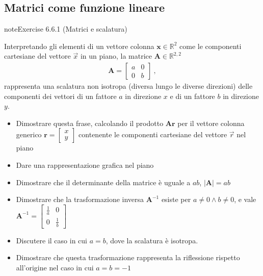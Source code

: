 \documentclass[letterpaper,10pt,italian]{jupyterBook}
\begin{document}
\subsection{Matrici come funzione lineare}
\label{\detokenize{ch/algebra/linear-algebra:matrici-come-funzione-lineare}}\label{\detokenize{ch/algebra/linear-algebra:math-hs-algebra-linear-problems-linear-fun}} \label{exercise:ch/algebra/linear-algebra-exercise-7}

\begin{sphinxadmonition}{note}{Exercise 6.6.1 (Matrici e scalatura)}



\sphinxAtStartPar
Interpretando gli elementi di un vettore colonna \(\mathbf{x} \in \mathbb{R}^2\) come le componenti cartesiane del vettore \(\vec{x}\) in un piano, la matrice \(\mathbf{A} \in \mathbb{R}^{2,2}\)
\begin{equation*}
\begin{split}\mathbf{A} = \begin{bmatrix} a & 0 \\ 0 & b \end{bmatrix} \ ,\end{split}
\end{equation*}
\sphinxAtStartPar
rappresenta una scalatura non isotropa (diversa lungo le diverse direzioni) delle componenti dei vettori di un fattore \(a\) in direzione \(x\) e di un fattore \(b\) in direzione \(y\).
\begin{itemize}
\item {} 
\sphinxAtStartPar
Dimostrare questa frase, calcolando il prodotto \(\mathbf{A} \mathbf{r}\) per il vettore colonna generico \(\mathbf{r} = \begin{bmatrix} x \\ y \end{bmatrix}\) contenente le componenti cartesiane del vettore \(\vec{r}\) nel piano

\item {} 
\sphinxAtStartPar
Dare una rappresentazione grafica nel piano

\item {} 
\sphinxAtStartPar
Dimostrare che il determinante della matrice è uguale a \(ab\), \(|\mathbf{A}| = ab\)

\item {} 
\sphinxAtStartPar
Dimostrare che la trasformazione inversa \(\mathbf{A}^{-1}\) esiste per \(a \ne 0 \land b \ne 0\), e vale \(\mathbf{A}^{-1} = \begin{bmatrix} \frac{1}{a} & 0 \\ 0 & \frac{1}{b} \end{bmatrix}\)

\item {} 
\sphinxAtStartPar
Discutere il caso in cui \(a = b\), dove la scalatura è isotropa.

\item {} 
\sphinxAtStartPar
Dimostrare che questa trasformazione rappresenta la riflessione rispetto all’origine nel caso in cui \(a = b = -1\)

\end{itemize}
\end{sphinxadmonition}
\end{document}
